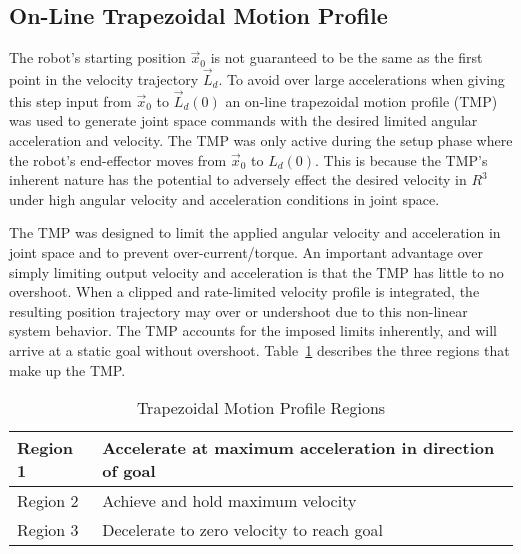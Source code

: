 \subsection{On-Line Trapezoidal Motion Profile}\label{sec:trap}

The robot's starting position $\vec{x}_0$ is not guaranteed to be the same as the
first point in the velocity trajectory $\vec{L}_d$.  To avoid over large
accelerations when giving this step input from $\vec{x}_0$ to $\vec{L}_d(0)$ an on-line
trapezoidal motion profile (TMP) was used to generate joint space commands with
the desired limited angular acceleration and velocity.  The TMP was only active
during the setup phase where the robot's end-effector moves from $\vec{x}_0$ to
$L_d(0)$.  This is because the TMP's inherent nature has the potential to adversely effect the desired velocity in $R^3$ under high angular velocity and acceleration conditions in joint space.

The TMP was designed to limit the applied angular velocity and acceleration in
joint space and to prevent over-current/torque. An important advantage over
simply limiting output velocity and acceleration is that the TMP has little to
no overshoot. When a clipped and rate-limited velocity profile is integrated,
the resulting position trajectory may over or undershoot due to this non-linear
system behavior.  The TMP accounts for the imposed limits inherently, and will
arrive at a static goal without overshoot.  Table~\ref{table:trap} describes the three regions
that make up the TMP.


\begin{table}[h]
\centering
\caption{Trapezoidal Motion Profile Regions}
\begin{tabular}{|l||l|}
\hline
Region 1	&	Accelerate at maximum acceleration in direction of goal \\ \hline
Region 2	& Achieve and hold maximum velocity \\ \hline
Region 3 	& Decelerate to zero velocity to reach goal \\ \hline
\end{tabular}

\label{table:trap}
\end{table}


